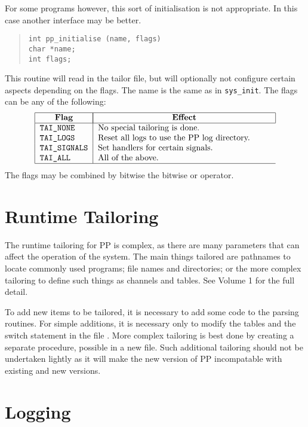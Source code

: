 For some programs however, this sort of initialisation is not
appropriate. In this case another interface may be better.
\begin{quote}\begin{verbatim}
int pp_initialise (name, flags)
char *name;
int flags;
\end{verbatim}\end{quote}
This routine will read in the tailor file, but will optionally not
configure certain aspects depending on the flags. The name is the same
as in \verb|sys_init|. The flags can be any of the following:
\[\begin{tabular}{|l|p{.6\textwidth}}
\hline
	\multicolumn{1}{|c|}{\bf Flag}&
		\multicolumn{1}{|c|}{\bf Effect} \\
\hline
	\tt TAI\_NONE & No special tailoring is done.\\
	\tt TAI\_LOGS & Reset all logs to use the PP log directory. \\
	\tt TAI\_SIGNALS & Set handlers for certain signals. \\
	\tt TAI\_ALL & All of the above. \\
\hline
\end{tabular}\]
The flags may be combined by bitwise the bitwise or operator.

\section {Runtime Tailoring}

The runtime tailoring for PP is complex, as there are many parameters
that can affect the operation of the system. The main things tailored
are pathnames to locate commonly used programs; file names and
directories; or the more complex tailoring to define such things as
channels and tables. See Volume 1 for the full detail.

To add new items to be tailored, it is necessary to add some code to
the parsing routines. For simple additions, it is necessary only to
modify the tables and the switch statement in the file
. More complex tailoring is best done by
creating a separate procedure, possible in a new file. Such additional
tailoring should not be undertaken lightly as it will make the new
version of PP incompatable with existing and new versions.

\section {Logging}

